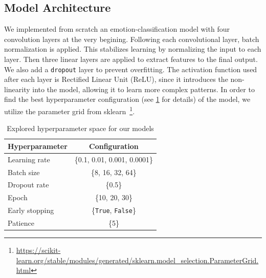 \subsection{Model Architecture}
We implemented from scratch an emotion-classification model with four convolution layers at the very begining. 
Following each convolutional layer, 
batch normalization is applied. 
This stabilizes learning by normalizing the input to each layer. 
Then three linear layers are applied to extract features to the final output. 
We also add a \texttt{dropout} layer to prevent overfitting. 
The activation function used after each layer is Rectified Linear Unit (ReLU), 
since it introduces the non-linearity into the model, 
allowing it to learn more complex patterns. 
In order to find the best hyperparameter configuration (see \cref{tab:hyper} for details) of the model, 
we utilize the parameter grid from sklearn~\footnote{\url{https://scikit-learn.org/stable/modules/generated/sklearn.model_selection.ParameterGrid.html}}. 


\begin{table}
  \centering
  \caption{Accuracy (\%) for different models in our experiments}
  \label{tab:model}
\end{table}

\begin{table}
    \centering
    \begin{tabular}{@{}lc@{}}
      \toprule
      Hyperparameter & Configuration \\
      \midrule
      Learning rate & \{0.1, 0.01, 0.001, 0.0001\}  \\
      Batch size & \{8, 16, 32, 64\} \\
      Dropout rate & \{0.5\} \\
      Epoch & \{10, 20, 30\} \\
      Early stopping & \{\texttt{True}, \texttt{False}\} \\
      Patience & \{5\} \\
      \bottomrule
    \end{tabular}
    \caption{Explored hyperparameter space for our models}
    \label{tab:hyper}
  \end{table}

